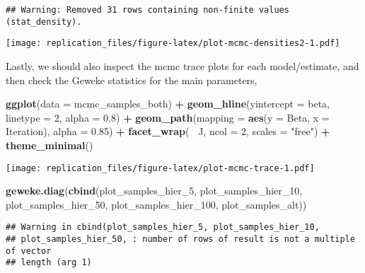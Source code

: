 \documentclass[]{article}
\newenvironment{Shaded}{\begin{snugshade}}{\end{snugshade}}
\newcommand{\KeywordTok}[1]{\textcolor[rgb]{0.13,0.29,0.53}{\textbf{#1}}}
\newcommand{\DataTypeTok}[1]{\textcolor[rgb]{0.13,0.29,0.53}{#1}}
\newcommand{\DecValTok}[1]{\textcolor[rgb]{0.00,0.00,0.81}{#1}}
\newcommand{\FloatTok}[1]{\textcolor[rgb]{0.00,0.00,0.81}{#1}}
\newcommand{\StringTok}[1]{\textcolor[rgb]{0.31,0.60,0.02}{#1}}
\newcommand{\OperatorTok}[1]{\textcolor[rgb]{0.81,0.36,0.00}{\textbf{#1}}}
\newcommand{\NormalTok}[1]{#1}
\begin{document}
\begin{verbatim}
## Warning: Removed 31 rows containing non-finite values (stat_density).
\end{verbatim}

\texttt{[image: replication\_files/figure-latex/plot-mcmc-densities2-1.pdf]}

Lastly, we should also inspect the mcmc trace plots for each
model/estimate, and then check the Geweke statistics for the main
parameters,

\begin{Shaded}
\begin{Highlighting}[]
\KeywordTok{ggplot}\NormalTok{(}\DataTypeTok{data =}\NormalTok{ mcmc_samples_both) }\OperatorTok{+}
\StringTok{    }\KeywordTok{geom_hline}\NormalTok{(}\DataTypeTok{yintercept =}\NormalTok{ beta,}
                \DataTypeTok{linetype =} \DecValTok{2}\NormalTok{,}
                \DataTypeTok{alpha =} \FloatTok{0.8}\NormalTok{) }\OperatorTok{+}
\StringTok{    }\KeywordTok{geom_path}\NormalTok{(}\DataTypeTok{mapping =} \KeywordTok{aes}\NormalTok{(}\DataTypeTok{y =}\NormalTok{ Beta, }\DataTypeTok{x =}\NormalTok{ Iteration),}
                \DataTypeTok{alpha =} \FloatTok{0.85}\NormalTok{) }\OperatorTok{+}
\StringTok{    }\KeywordTok{facet_wrap}\NormalTok{(}\OperatorTok{~}\StringTok{ }\NormalTok{J, }\DataTypeTok{ncol =} \DecValTok{2}\NormalTok{, }\DataTypeTok{scales =} \StringTok{"free"}\NormalTok{) }\OperatorTok{+}
\StringTok{    }\KeywordTok{theme_minimal}\NormalTok{()}
\end{Highlighting}
\end{Shaded}

\texttt{[image: replication\_files/figure-latex/plot-mcmc-trace-1.pdf]}

\begin{Shaded}
\begin{Highlighting}[]
\KeywordTok{geweke.diag}\NormalTok{(}\KeywordTok{cbind}\NormalTok{(plot_samples_hier_}\DecValTok{5}\NormalTok{,}
\NormalTok{                plot_samples_hier_}\DecValTok{10}\NormalTok{,}
\NormalTok{                plot_samples_hier_}\DecValTok{50}\NormalTok{,}
\NormalTok{                plot_samples_hier_}\DecValTok{100}\NormalTok{,}
\NormalTok{                plot_samples_alt))}
\end{Highlighting}
\end{Shaded}

\begin{verbatim}
## Warning in cbind(plot_samples_hier_5, plot_samples_hier_10,
## plot_samples_hier_50, : number of rows of result is not a multiple of vector
## length (arg 1)
\end{verbatim}
\end{document}
